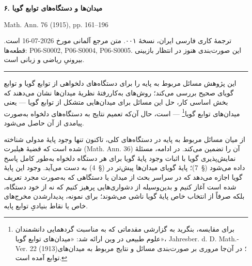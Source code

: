 \documentclass[12pt]{article}
\begin{document}
\begin{center}
  {\Large\bfseries ۶. میدان‌ها و دستگاه‌های توابع گویا\par}
  \vspace{0.8em}
  \textenglish{Math. Ann. 76 (1915), pp. 161--196}
\end{center}

\vspace{0.5em}
{\footnotesize\noindent
ترجمهٔ کاری فارسی ایران، نسخهٔ ۰۰۱. متن مرجع آلمانی مورخ
\textenglish{2026-07-16} است. قطعه‌ها:
\textenglish{P06-S0002, P06-S0004, P06-S0005}. این صورت‌بندی هنوز در انتظار بازبینی
بیرونیِ ریاضی و زبانی است.\par}
\vspace{0.5em}
\hrule
\vspace{1.2em}

این پژوهش مسائل مربوط به پایه را برای دستگاه‌های دلخواهی از توابع گویا و
توابع گویای صحیح بررسی می‌کند؛ روش‌های به‌کاررفتهٔ نظریهٔ میدان‌ها نشان
می‌دهند که بخش اساسی کار، حل این مسائل برای میدان‌هایی متشکل از توابع
گویا --- یعنی میدان‌های توابع گویا\footnote{برای مقایسه، بنگرید به گزارشی
مقدماتی که به مناسبت گردهمایی دانشمندان علوم طبیعی در وین ارائه شد:
«میدان‌های توابع گویا»،
\textenglish{Jahresber. d. D. Math.-Ver. 22 (1913)}؛ در آن‌جا مروری بر
صورت‌بندی مسائل و نتایج مربوط به میدان‌های توابع آمده است.} --- است، حال
آن‌که تعمیم نتایج به دستگاه‌های دلخواه به‌صورت پیامدی از آن حاصل می‌شود.

از میان مسائل مربوط به پایه در دستگاه‌های کلی، تاکنون تنها وجود پایهٔ
مدولی شناخته شده است که قضیهٔ هیلبرت (\textenglish{Math. Ann. 36}) آن را
تضمین می‌کند. در ادامه، مسئلهٔ نمایش‌پذیری گویا با اثبات وجود پایهٔ گویا
برای هر دستگاه دلخواه به‌طور کامل پاسخ داده می‌شود
(\textenglish{\S~7})؛ پایهٔ گویای میدان‌ها پیش‌تر در
(\textenglish{\S~4}) به دست می‌آید. وجود این پایهٔ گویا اجازه می‌دهد که
در سراسر بحث از میدان یا دستگاهی که به‌صورت مجرد تعریف شده است آغاز کنیم
و بدین‌وسیله از دشواری‌هایی پرهیز کنیم که نه از خود دستگاه، بلکه صرفاً از
انتخاب خاص پایهٔ گویا ناشی می‌شوند؛ برای نمونه، پدیدارشدن مخرج‌های خاص یا
نقاط بنیادیِ توابع پایه.
\end{document}
